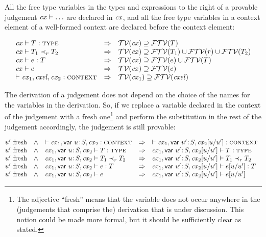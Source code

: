 

All the free type variables in the types and expressions to the right of a
provable judgement $\mathit{cx}\vdash\ldots$ are declared in $\mathit{cx}$, and all the free
type variables in a context element of a well-formed context are declared
before the context element:

\begin{theorem}\label{thm-free-tvar-in-cx}
\[
\begin{array}{l@{\ \ \IMPLIES\ \ }l}
\istyO{\typ} &
 \cxtvarO\supseteq\ftvar{\typ} \\
\issubO{\typ_1}{\tspred}{\typ_2} &
 \cxtvarO\supseteq\ftvar{\typ_1}\cup\ftvar{\tspred}\cup\ftvar{\typ_2} \\
\hastyO{\expr}{\typ} &
 \cxtvarO\supseteq\ftvar{\expr}\cup\ftvar{\typ} \\
\theoO{\expr} &
 \cxtvarO\supseteq\ftvar{\expr} \\
\cxwf{\cx_1,\cxel,\cx_2} &
 \cxtvar{\cx_1}\supseteq\ftvar{\cxel}
\end{array}
\]
\end{theorem}

The derivation of a judgement does not depend on the choice of the names for
the variables in the derivation. So, if we replace a variable declared in the
context of the judgement with a fresh one\footnote{The adjective ``fresh''
means that the variable does not occur anywhere in the (judgements that
comprise the) derivation that is under discussion. This notion could be made
more formal, but it should be sufficiently clear as stated.} and perform the
substitution in the rest of the judgement accordingly, the judgement is still
provable:

\begin{theorem}\label{thm-deriv-rename-var}
\[
\begin{array}{@{\fresh{\varI'}\ \ \AND\ \ }l@{\ \ \IMPLIES\ \ }l}
\cxwf{\cxv} &
 \cxwf{\cxvI} \\
\isty{\cxv}{\typ} &
 \isty{\cxvI}{\typ} \\
\issub{\cxv}{\typ_1}{\tspred}{\typ_2} &
 \issub{\cxvI}{\typ_1}{\tspred}{\typ_2} \\
\hasty{\cxv}{\expr}{\typ} &
 \hasty{\cxvI}{\esbsren{\expr}}{\typ} \\
\theo{\cxv}{\expr} &
 \theo{\cxvI}{\esbsren{\expr}}
\end{array}
\]
\end{theorem}

